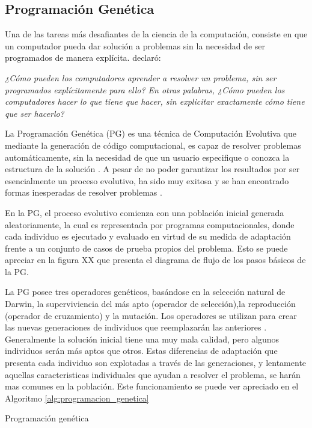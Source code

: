 \subsection{Programación Genética}
\label{cap:pg}


Una de las tareas más desafiantes de la ciencia de la computación, consiste en que un computador pueda dar solución a problemas sin la necesidad de ser programados de manera explícita. \cite{samuel1959some} declaró:

\textit{¿Cómo pueden los computadores aprender a resolver un problema, sin ser programados explícitamente para ello? En otras palabras, ¿Cómo pueden los computadores hacer lo que tiene que hacer, sin explicitar exactamente cómo tiene que ser hacerlo?}

La Programación Genética (PG) es una técnica de Computación Evolutiva que mediante la generación de código computacional, es capaz de resolver problemas automáticamente, sin la necesidad de que un usuario especifique o conozca la estructura de la solución \citep{poli_2008}. A pesar de no poder garantizar los resultados por ser esencialmente un proceso evolutivo, ha sido muy exitosa y se han encontrado formas inesperadas de resolver problemas \citep{holland_1975}.

En la PG, el proceso evolutivo comienza con una población inicial generada aleatoriamente, la cual es representada por programas computacionales, donde cada individuo es ejecutado y evaluado en virtud de su medida de adaptación frente a un conjunto de casos de prueba propios del problema. Esto se puede apreciar en la figura XX que presenta el diagrama de flujo de los pasos básicos de la PG.


La PG posee tres operadores genéticos, basándose en la selección natural de Darwin, la superviviencia del más apto (operador de selección),la reproducción (operador de cruzamiento) y la mutación. Los operadores se utilizan para crear las nuevas generaciones de individuos que reemplazarán las anteriores \citep{poli_2008}. Generalmente la solución inicial tiene una muy mala calidad, pero algunos individuos serán más aptos que otros. Estas diferencias de adaptación que presenta cada individuo son explotadas a través de las generaciones, y lentamente aquellas caracteristicas individuales que ayudan a resolver el problema, se harán mas comunes en la población. Este funcionamiento se puede ver apreciado en el Algoritmo \ref{alg:programacion_genetica}
\begin{algorithm}[H]
    \begin{algorithmic}[1]
        \ENDWHILE
    \end{algorithmic}
    \caption{Programación genética}\label{alg:programacion_genetica}
\end{algorithm}




